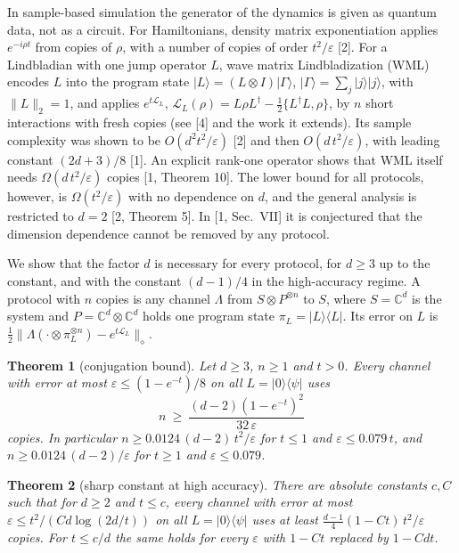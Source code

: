 \documentclass[11pt]{article}
\newtheorem{theorem}{Theorem}
\theoremstyle{remark}
\newcommand{\Lind}{\mathcal{L}}
\newcommand{\dn}[1]{\lVert #1 \rVert_\diamond}
\newcommand{\ket}[1]{\lvert #1 \rangle}
\newcommand{\bra}[1]{\langle #1 \rvert}
\newcommand{\proj}[1]{\lvert #1 \rangle\langle #1 \rvert}
\begin{document}
In sample-based simulation the generator of the dynamics is given as quantum data, not as a circuit. For Hamiltonians, density matrix exponentiation applies $e^{-i\rho t}$ from copies of $\rho$, with a number of copies of order $t^2/\varepsilon$ [2]. For a Lindbladian with one jump operator $L$, wave matrix Lindbladization (WML) encodes $L$ into the program state $\ket{L} = (L \otimes I)\ket{\Gamma}$, $\ket{\Gamma} = \sum_j \ket{j}\ket{j}$, with $\lVert L\rVert_2 = 1$, and applies $e^{t\Lind_L}$, $\Lind_L(\rho) = L\rho L^\dagger - \tfrac12\{L^\dagger L, \rho\}$, by $n$ short interactions with fresh copies (see [4] and the work it extends). Its sample complexity was shown to be $O(d^2 t^2/\varepsilon)$ [2] and then $O(d\,t^2/\varepsilon)$, with leading constant $(2d+3)/8$ [1]. An explicit rank-one operator shows that WML itself needs $\Omega(d\,t^2/\varepsilon)$ copies [1, Theorem 10]. The lower bound for all protocols, however, is $\Omega(t^2/\varepsilon)$ with no dependence on $d$, and the general analysis is restricted to $d = 2$ [2, Theorem 5]. In [1, Sec.~VII] it is conjectured that the dimension dependence cannot be removed by any protocol.

We show that the factor $d$ is necessary for every protocol, for $d \ge 3$ up to the constant, and with the constant $(d-1)/4$ in the high-accuracy regime. A protocol with $n$ copies is any channel $\Lambda$ from $S \otimes P^{\otimes n}$ to $S$, where $S = \mathbb{C}^d$ is the system and $P = \mathbb{C}^d \otimes \mathbb{C}^d$ holds one program state $\pi_L = \proj{L}$. Its error on $L$ is $\tfrac12 \dn{\Lambda(\cdot \otimes \pi_L^{\otimes n}) - e^{t\Lind_L}}$.

\begin{theorem}[conjugation bound]\label{thm:conj}
Let $d \ge 3$, $n \ge 1$ and $t > 0$. Every channel with error at most $\varepsilon \le (1-e^{-t})/8$ on all $L = \ket{0}\bra{\psi}$ uses
\[
n \ \ge\ \frac{(d-2)(1-e^{-t})^2}{32\,\varepsilon}
\]
copies. In particular $n \ge 0.0124\,(d-2)\,t^2/\varepsilon$ for $t \le 1$ and $\varepsilon \le 0.079\,t$, and $n \ge 0.0124\,(d-2)/\varepsilon$ for $t \ge 1$ and $\varepsilon \le 0.079$.
\end{theorem}

\begin{theorem}[sharp constant at high accuracy]\label{thm:sharp}
There are absolute constants $c, C$ such that for $d \ge 2$ and $t \le c$, every channel with error at most $\varepsilon \le t^2/(C d \log(2d/t))$ on all $L = \ket{0}\bra{\psi}$ uses at least $\tfrac{d-1}{4}(1 - Ct)\,t^2/\varepsilon$ copies. For $t \le c/d$ the same holds for every $\varepsilon$ with $1 - Ct$ replaced by $1 - Cdt$.
\end{theorem}
\end{document}
